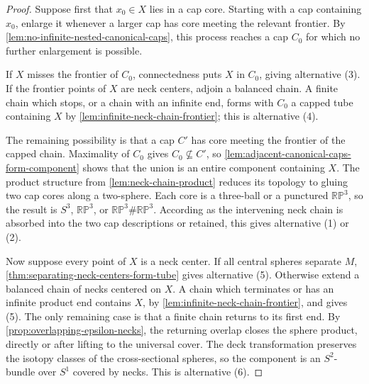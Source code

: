 \begin{proof}
Suppose first that $x_0\in X$ lies in a cap core.  Starting with a cap
containing $x_0$, enlarge it whenever a larger cap has core meeting the
relevant frontier.  By
\ref{lem:no-infinite-nested-canonical-caps}, this process reaches a cap
$C_0$ for which no further enlargement is possible.

If $X$ misses the frontier of $C_0$, connectedness puts $X$ in $C_0$,
giving alternative (3).  If the frontier points of $X$ are neck centers,
adjoin a balanced chain.  A finite chain which stops, or a chain with an
infinite end, forms with $C_0$ a capped tube containing $X$ by
\ref{lem:infinite-neck-chain-frontier}; this is alternative (4).

The remaining possibility is that a cap $C'$ has core meeting the frontier
of the capped chain.  Maximality of $C_0$ gives $C_0\nsubseteq C'$, so
\ref{lem:adjacent-canonical-caps-form-component} shows that the union is
an entire component containing $X$.  The product structure from
\ref{lem:neck-chain-product} reduces its topology to gluing two cap cores
along a two-sphere.  Each core is a three-ball or a punctured
$\mathbb{RP}^3$, so the result is $S^3$, $\mathbb{RP}^3$, or
$\mathbb{RP}^3\#\mathbb{RP}^3$.  According as the intervening neck chain
is absorbed into the two cap descriptions or retained, this gives
alternative (1) or (2).

Now suppose every point of $X$ is a neck center.  If all central spheres
separate $M$, \ref{thm:separating-neck-centers-form-tube} gives
alternative (5).  Otherwise extend a balanced chain of necks centered on
$X$.  A chain which terminates or has an infinite product end contains
$X$, by \ref{lem:infinite-neck-chain-frontier}, and gives (5).  The only
remaining case is that a finite chain returns to its first end.
By \ref{prop:overlapping-epsilon-necks}, the returning overlap closes the
sphere product, directly or after lifting to the universal cover.  The deck
transformation preserves the isotopy classes of the cross-sectional
spheres, so the component is an $S^2$-bundle over $S^1$ covered by necks.
This is alternative (6).
\end{proof}

